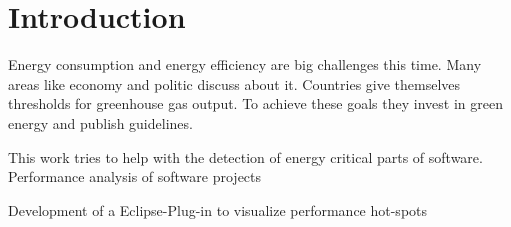 \chapter{Introduction}
\label{chap:introduction}


Energy consumption and energy efficiency are big challenges this time. Many areas like economy and politic discuss about it. Countries give themselves thresholds for greenhouse gas output. To achieve these goals they invest in green energy and publish guidelines.


This work tries to help with the detection of energy critical parts of software.
Performance analysis of software projects

Development of a Eclipse-Plug-in to visualize performance hot-spots

